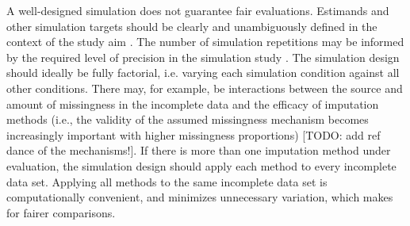 \documentclass[bimj,fleqn]{w-art}
\begin{document}





% 

A well-designed simulation does not guarantee fair evaluations. Estimands and other simulation targets should be clearly and unambiguously defined in the context of the study aim \citet{pete14}. The number of simulation repetitions may be informed by the required level of precision in the simulation study \citep[e.g. as determined from a maximum tolerable level of uncertainty in terms of a performance measure's Monte Carlo error][]{morr18}. The simulation design should ideally be fully factorial, i.e. varying each simulation condition against all other conditions. There may, for example, be interactions between the source and amount of missingness in the incomplete data and the efficacy of imputation methods (i.e., the validity of the assumed missingness mechanism becomes increasingly important with higher missingness proportions) [TODO: add ref dance of the mechanisms!]. If there is more than one imputation method under evaluation, the simulation design should apply each method to every incomplete data set. Applying all methods to the same incomplete data set is computationally convenient, and minimizes unnecessary variation, which makes for fairer comparisons.
\end{document}
